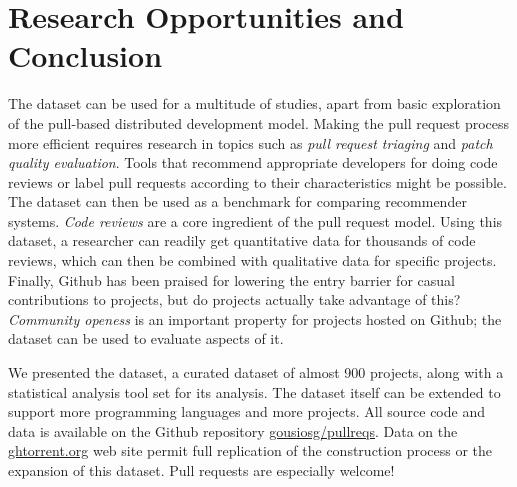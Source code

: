 \documentclass{sig-alternate}
\begin{document}
\section{Research Opportunities and Conclusion}

The \pullreqs dataset can be used for a multitude of studies, apart from basic
exploration of the pull-based distributed development model. Making the pull
request process more efficient requires research in topics such as \emph{pull
request triaging} and \emph{patch quality evaluation}.  Tools that recommend
appropriate developers for doing code reviews or label pull requests according
to their characteristics might be possible. The dataset can then be used as a
benchmark for comparing recommender systems. \emph{Code reviews} are a core
ingredient of the pull request model. Using this dataset, a researcher can
readily get quantitative data for thousands of code reviews, which can then be
combined with qualitative data for specific projects.  Finally, Github has been
praised for lowering the entry barrier for casual contributions to projects, but
do projects actually take advantage of this? \emph{Community openess} is an
important property for projects hosted on Github; the \pullreqs dataset can be
used to evaluate aspects of it.

We presented the \pullreqs dataset, a curated dataset of almost 900 projects,
along with a statistical analysis tool set for its analysis. The
dataset itself can be extended to support more programming languages and more
projects. All source code and data is available on the Github repository
\href{https://github.com/gousiosg/pullreqs}{gousiosg/pullreqs}. Data on the
\href{http://ghtorrent.org}{ghtorrent.org} web site permit full replication
of the construction process or the expansion of this dataset.
Pull requests are especially welcome!



\balance

  
\end{document}
